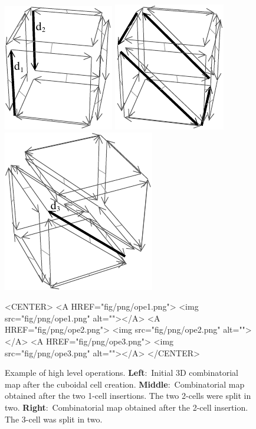 %
\def\largFig{.25\textwidth}%
\begin{figure}
  \begin{ccTexOnly}
    \begin{center}
      \includegraphics[width=\largFig]{Combinatorial_map/fig/pdf/ope1}\qquad
      \includegraphics[width=\largFig]{Combinatorial_map/fig/pdf/ope2}\qquad
      \includegraphics[width=\largFig]{Combinatorial_map/fig/pdf/ope3}
    \end{center}
  \end{ccTexOnly}
  \begin{ccHtmlOnly}
    <CENTER>
    <A HREF="fig/png/ope1.png"> <img src="fig/png/ope1.png" alt=""></A>
    <A HREF="fig/png/ope2.png"> <img src="fig/png/ope2.png" alt=""></A>
    <A HREF="fig/png/ope3.png"> <img src="fig/png/ope3.png" alt=""></A>
    </CENTER>
    \end{ccHtmlOnly}  
      \caption{Example of high level operations.  
        \textbf{Left}:~Initial 3D combinatorial map after the cuboidal 
        cell creation. \textbf{Middle}:~Combinatorial map obtained after
        the two 1-cell insertions. The two 2-cells were split in two.
        \textbf{Right}:~Combinatorial map obtained after the 2-cell 
        insertion. The 3-cell was split in two.}
    \label{fig_exemple_ope}
\end{figure}


